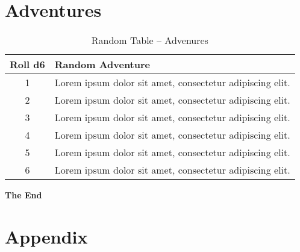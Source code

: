 \documentclass{zine}
\begin{document}
\section{Adventures}
\lipsum[9]
\begin{table}[ht]
    \centering
    \begin{tabular}{|c|p{14.5cm}|}
        \hline
        \textbf{Roll d6} & \textbf{Random Adventure} \\
        \hline
        \hline
        1 & Lorem ipsum dolor sit amet, consectetur adipiscing elit.\\
        2 & Lorem ipsum dolor sit amet, consectetur adipiscing elit.\\
        3 & Lorem ipsum dolor sit amet, consectetur adipiscing elit.\\
        4 & Lorem ipsum dolor sit amet, consectetur adipiscing elit.\\
        5 & Lorem ipsum dolor sit amet, consectetur adipiscing elit.\\
        6 & Lorem ipsum dolor sit amet, consectetur adipiscing elit.\\
        \hline
    \end{tabular}
    \caption{Random Table -- Advenures}
\end{table}

\colbox{
    \lipsum[10]
}


\begin{center}
    \textbf{The End}
\end{center}

\newpage
\section*{\centering Appendix}
\renewcommand{\thesubsection}{\arabic{subsection}}
\vspace{0.4cm}
\end{document}
